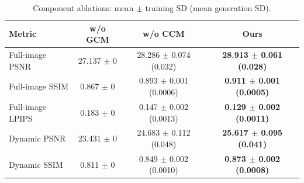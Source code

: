 \begin{table}[H]
\centering\small
\setlength{\tabcolsep}{4pt}
\caption{Component ablations: mean $\pm$ training SD (mean generation SD).}
\label{tab:seed-components}
\begin{tabular}{@{}lccc@{}}
\toprule
Metric & w/o GCM & w/o CCM & Ours \\
\midrule
Full-image PSNR & 27.137 $\pm$ 0 & 28.286 $\pm$ 0.074 (0.032) & \textbf{28.913 $\pm$ 0.061 (0.028)} \\
Full-image SSIM & 0.867 $\pm$ 0 & 0.893 $\pm$ 0.001 (0.0006) & \textbf{0.911 $\pm$ 0.001 (0.0005)} \\
Full-image LPIPS & 0.183 $\pm$ 0 & 0.147 $\pm$ 0.002 (0.0013) & \textbf{0.129 $\pm$ 0.002 (0.0011)} \\
Dynamic PSNR & 23.431 $\pm$ 0 & 24.683 $\pm$ 0.112 (0.048) & \textbf{25.617 $\pm$ 0.095 (0.041)} \\
Dynamic SSIM & 0.811 $\pm$ 0 & 0.849 $\pm$ 0.002 (0.0010) & \textbf{0.873 $\pm$ 0.002 (0.0008)} \\
\bottomrule
\end{tabular}
\end{table}

